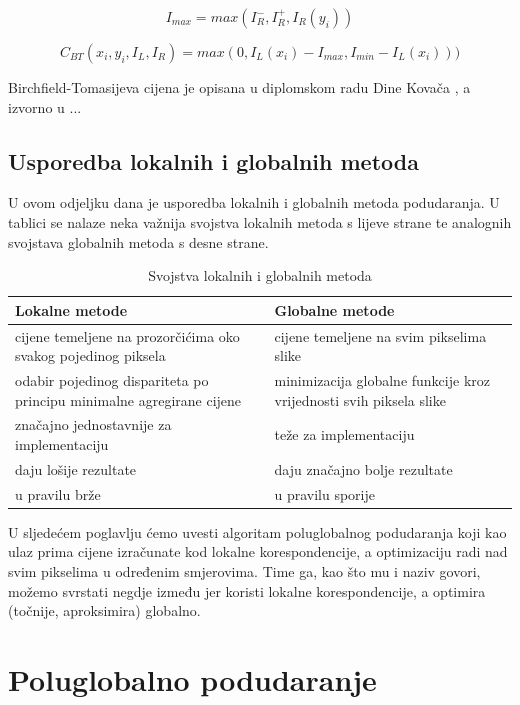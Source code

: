 \documentclass[utf8, zavrsni, numeric]{fer}
\begin{document}
\begin{equation}
I_{max} = max(I^-_R, I^+_R, I_R(y_i))
\end{equation}

\begin{equation}
C_{BT}(x_i, y_i, I_L, I_R) = max(0, I_L(x_i) - I_{max}, I_{min} - I_L(x_i)))
\end{equation}

Birchfield-Tomasijeva cijena je opisana u diplomskom radu Dine Kovača \citet{kovac15ms}, a izvorno u ...

\section{Usporedba lokalnih i globalnih metoda}
U ovom odjeljku dana je usporedba lokalnih i globalnih metoda podudaranja.
U tablici se nalaze neka važnija svojstva lokalnih metoda s lijeve strane te
analognih svojstava globalnih metoda s desne strane.

\begin{table}[H]
  \caption{Svojstva lokalnih i globalnih metoda}
  \label{tbl:usp_lok_glob}
  \centering
  \begin{tabularx}{\textwidth}{X|X} \hline
    {\bf Lokalne metode} & {\bf Globalne metode} \\
    \hline
    cijene temeljene na prozorčićima oko svakog pojedinog piksela & cijene temeljene na svim pikselima slike \\
    \hline
    odabir pojedinog dispariteta po principu minimalne agregirane cijene & minimizacija globalne funkcije kroz vrijednosti svih piksela slike \\
    \hline
    značajno jednostavnije za implementaciju & teže za implementaciju \\
    \hline
    daju lošije rezultate & daju značajno bolje rezultate \\
    \hline
    u pravilu brže & u pravilu sporije \\
  \end{tabularx}
\end{table}

U sljedećem poglavlju ćemo uvesti algoritam poluglobalnog podudaranja koji kao ulaz prima cijene izračunate kod lokalne korespondencije, a optimizaciju radi nad svim
pikselima u određenim smjerovima. Time ga, kao što mu i naziv govori, možemo svrstati negdje između jer koristi lokalne korespondencije, a optimira (točnije, aproksimira) globalno.


\chapter{Poluglobalno podudaranje}
\end{document}
